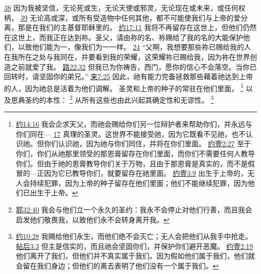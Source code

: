 \documentclass[12pt, a4paper, oneside]{ctexart}
\begin{document}
{		\href{https://biblehub.com/romans/8-38.htm}{38} 因为我被坚信，无论死或生，无论天使或邪灵，无论现在或未来，或任何权柄，
		\href{https://biblehub.com/romans/8-39.htm}{39} 无论高或深，或所有受造物中任何其他，都不可能使我们与上帝的爱分离，那是在我们的主基督耶稣里的。
		\href{https://biblehub.com/john/17-11.htm}{约17:11} 我将不再留存在这世上，但他们仍然在这世上，而我正在达到祢。圣父，请由祢的名、祢赐给了我的名的大能保护他们，以致他们能为一，像我们为一一样。
		\href{https://biblehub.com/john/17-24.htm}{24} “父啊，我想要那些祢已赐给我的人在我所在之处与我同在，并要看到我的荣耀，这荣耀祢已赐给我，因为祢在世界创造之前就爱了我。
		\href{https://biblehub.com/luke/22-32.htm}{路22:32} 但我已为你祷告，西门，愿你的信心不会落空。当你已回转时，请坚固你的弟兄。”
		\href{https://biblehub.com/hebrews/7-25.htm}{来7:25} 因此，祂有能力完备拯救那些藉着祂达到上帝的人，因为祂总是活着为他们调解。
	}
	圣灵和上帝的种子的常驻在他们里面，
	\footnote {
		\href{https://biblehub.com/john/14-16.htm}{约14:16} 我会企求天父，而祂会赐给你们另一位辩护者来帮助你们，并永远与你们同在---
		\href{https://biblehub.com/john/14-17.htm}{17} 真理的圣灵。这世界不能接受祂，因为它既看不见祂，也不认识祂。但你们认识祂，因为祂与你们同住，并将在你们里面。
		\href{https://biblehub.com/1_john/2-27.htm}{约壹2:27} 至于你们，你们从祂那里领受的那恩膏留存在你们里面，而你们不需要任何人教导你们。但由于祂的恩膏教导你们关于万物，且由于那恩膏是真实的，而不是假冒的---正因为它已教导你们，就要留存在祂里面。
		\href{https://biblehub.com/1_john/3-9.htm}{约壹3:9} 出生于上帝的，无人会持续犯罪，因为上帝的种子留存在他们里面；他们不能继续犯罪，因为他们已出生于上帝。
	}
	以及恩典圣约的本性：
	\footnote {
		\href{https://biblehub.com/jeremiah/32-40.htm}{耶32:40} 我会与他们立一个永久的圣约：我永不会停止对他们行善，而且我会启发他们敬畏我，以致他们永不会转身离开我。
	}
	从所有这些也由此兴起其确定性和无谬性。
	\footnote {
		\href{https://biblehub.com/john/10-28.htm}{约10:28} 我赐给他们永生，而他们绝不会灭亡；无人会把他们从我手中抢走。
		\href{https://biblehub.com/2_thessalonians/3-3.htm}{帖后3:3} 但主是信实的，而且祂会坚固你们，并保护你们避开恶魔。
		\href{https://biblehub.com/1_john/2-19.htm}{约壹2:19} 他们离开了我们，但他们并不真实属于我们。因为假如他们属于我们，他们就会留在我们身边；但他们的离去表明了他们没有一个属于我们。
	}
\end{document}
